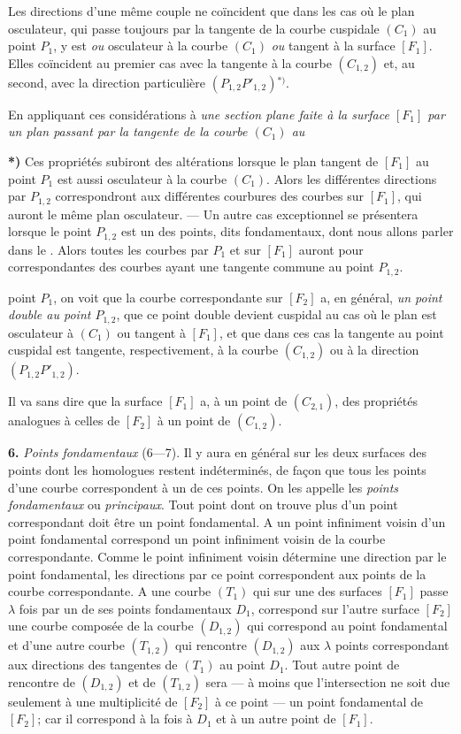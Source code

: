 \documentclass{article}
\begin{document}
Les directions d'une même couple ne coïncident que dans les cas où le plan osculateur, qui passe toujours par la tangente de la courbe cuspidale $(C_1)$ au point $P_1$, y est \emph{ou} osculateur à la courbe $(C_1)$ \emph{ou} tangent à la surface $[F_1]$. Elles coïncident au premier cas avec la tangente à la courbe $(C_{1, 2})$ et, au second, avec la direction particulière $(P_{1, 2} P'_{1, 2})$${}^{*)}$.

En appliquant ces considérations à \emph{une section plane faite à la surface $[F_1]$ par un plan passant par la tangente de la courbe $(C_1)$ au}

\textbf{*)} Ces propriétés subiront des altérations lorsque le plan tangent de $[F_1]$ au point $P_1$ est aussi osculateur à la courbe $(C_1)$. Alors les différentes directions par $P_{1, 2}$ correspondront aux différentes courbures des courbes sur $[F_1]$, qui auront le même plan osculateur. --- Un autre cas exceptionnel se présentera lorsque le point $P_{1, 2}$ est un des points, dits fondamentaux, dont nous allons parler dans le . Alors toutes les courbes par $P_1$ et sur $[F_1]$ auront pour correspondantes des courbes ayant une tangente commune au point $P_{1, 2}$.

point $P_1$, on voit que la courbe correspondante sur $[F_2]$ a, en général, \emph{un point double au point $P_{1, 2}$}, que ce point double devient cuspidal au cas où le plan est osculateur à $(C_1)$ ou tangent à $[F_1]$, et que dans ces cas la tangente au point cuspidal est tangente, respectivement, à la courbe $(C_{1, 2})$ ou à la direction $(P_{1, 2} P'_{1, 2})$.

Il va sans dire que la surface $[F_1]$ a, à un point de $(C_{2, 1})$, des propriétés analogues à celles de $[F_2]$ à un point de $(C_{1, 2})$.

\textbf{6.} \emph{Points fondamentaux} (6---7). Il y aura en général sur les deux surfaces des points dont les homologues restent indéterminés, de façon que tous les points d'une courbe correspondent à un de ces points. On les appelle les \emph{points fondamentaux} ou \emph{principaux}. Tout point dont on trouve plus d'un point correspondant doit être un point fondamental. A un point infiniment voisin d'un point fondamental correspond un point infiniment voisin de la courbe correspondante. Comme le point infiniment voisin détermine une direction par le point fondamental, les directions par ce point correspondent aux points de la courbe correspondante. A une courbe $(T_1)$ qui sur une des surfaces $[F_1]$ passe $\lambda$ fois par un de ses points fondamentaux $D_1$, correspond sur l'autre surface $[F_2]$ une courbe composée de la courbe $(D_{1, 2})$ qui correspond au point fondamental et d'une autre courbe $(T_{1, 2})$ qui rencontre $(D_{1, 2})$ aux $\lambda$ points correspondant aux directions des tangentes de $(T_1)$ au point $D_1$. Tout autre point de rencontre de $(D_{1, 2})$ et de $(T_{1, 2})$ sera --- à moins que l'intersection ne soit due seulement à une multiplicité de $[F_2]$ à ce point --- un point fondamental de $[F_2]$; car il correspond à la fois à $D_1$ et à un autre point de $[F_1]$.
\end{document}
